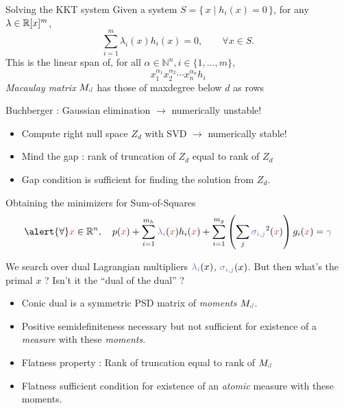 \documentclass{beamer}
\newcommand{\symvar}[1]{\textcolor{julia_red}{#1}}
\newcommand{\decisionvar}[1]{\textcolor{julia_purple}{#1}}
\begin{document}
\begin{frame}{Solving the KKT system}
  Given a system $S = \{\, x \mid h_i(x) = 0 \,\}$, %
  for any $\lambda \in \mathbb{R}[x]^m$,
  \[
    \sum_{i=1}^m \lambda_i(x) h_i(x) = 0, \qquad \forall x \in S.
  \]
  This is the linear span of,
  for all $\alpha \in \mathbb{N}^n, i \in \{1, \ldots, m\}$,
  \[
    x_1^{\alpha_1}x_2^{\alpha_2} \cdots x_n^{\alpha_n} h_i
  \]
  \emph{\alert{Macaulay} matrix} $M_{\textcolor{julia_purple}{d}}$ has those of maxdegree below \textcolor{julia_green}{$d$} as rows

  Buchberger : \alert{Gaussian elimination} $\to$ \alert{numerically unstable}!

  \begin{itemize}
    \item Compute right null space $Z_d$ with SVD $\to$ \alert{numerically stable}!
    \item \alert{Mind the gap} : rank of \textcolor{julia_purple}{truncation} of $Z_d$ equal to rank of $Z_d$
    \item Gap condition is \alert{sufficient} for finding the solution from $Z_d$.
  \end{itemize}
\end{frame}

\begin{frame}{Obtaining the minimizers for Sum-of-Squares}
    \[
      \alert{\forall} \symvar{x} \in \R^n, \quad p(\symvar{x}) + \sum_{i=1}^{m_h} \decisionvar{\lambda_i}(\symvar{x}) h_i(\symvar{x}) + \sum_{i=1}^{m_g} \left(\sum_j \decisionvar{\sigma_{i,j}}^2(\symvar{x})\right) g_i(\symvar{x}) = \decisionvar{\gamma}
    \]

  We search over \alert{dual} Lagrangian multipliers $\decisionvar{\lambda_i}(x)$, $\decisionvar{\sigma_{i,j}}(x)$.
  But then what's the \alert{primal} \symvar{$x$} ? Isn't it the ``dual of the dual'' ?

  \begin{itemize}
    \item \alert{Conic} dual is a symmetric \alert{PSD} matrix of \emph{moments} $M_{\textcolor{julia_purple}{d}}$.
    \item Positive semidefiniteness \alert{necessary} but not \alert{sufficient}
    for existence of a \emph{measure} with these \emph{moments}.
    \item \alert{Flatness property} : Rank of \textcolor{julia_purple}{truncation} equal to rank of $M_{\textcolor{julia_purple}{d}}$
    \item Flatness \alert{sufficient} condition for existence of an \emph{atomic}
    measure with these moments.
  \end{itemize}
\end{frame}
\end{document}

